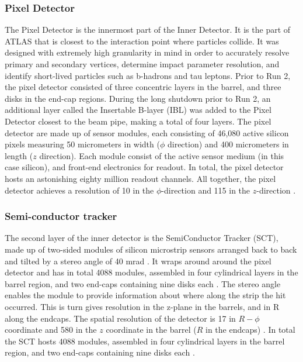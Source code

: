 \subsubsection{Pixel Detector}

The Pixel Detector is the innermost part of the Inner Detector. It is the part of ATLAS that is closest to the interaction point where particles collide. It was designed with extremely high granularity in mind in order to accurately resolve primary and secondary vertices, determine impact parameter resolution, and identify short-lived particles such as b-hadrons and tau leptons. Prior to Run 2, the pixel detector consisted of three concentric layers in the barrel, and three disks in the end-cap regions. During the long shutdown prior to Run 2, an additional layer called the Insertable B-layer (IBL) \cite{Capeans:1291633} was added to the Pixel Detector closest to the beam pipe, making a total of four layers. The pixel detector are made up of sensor modules, each consisting of 46,080 active silicon pixels measuring 50 micrometers in width ($\phi$ direction) and 400 micrometers in length ($z$ direction). Each module consist of the active sensor medium (in this case silicon), and front-end electronics for readout. In total, the pixel detector hosts an astonishing eighty million readout channels. All together, the pixel detector achieves a resolution of \unit{10}{\micro\meter} in the $\phi$-direction and \unit{115}{\micro\meter} in the $z$-direction .

\subsubsection{Semi-conductor tracker}

The second layer of the inner detector is the SemiConductor Tracker (SCT), made up of two-sided modules of silicon microstrip sensors arranged back to back and tilted by a stereo angle of 40 mrad \cite{AHMAD200798}. It wraps around around the pixel detector and has in total 4088 modules, assembled in four cylindrical layers in the barrel region, and two end-caps containing nine disks each \cite{CERN-LHCC-2017-005}. The stereo angle enables the module to provide information about where along the strip the hit occurred. This is turn gives resolution in the z-plane in the barrels, and in R along the endcaps. The spatial resolution of the detector is \unit{17}{\mu\meter} in $R-\phi$ coordinate and \unit{580}{\mu\meter} in the $z$ coordinate in the barrel ($R$ in the endcaps) \cite{Abdesselam:974073}. In total the SCT hosts 4088 modules, assembled in four cylindrical layers in the barrel region, and two end-caps containing nine disks each \cite{CERN-LHCC-2017-005}. 

